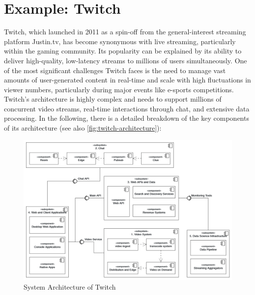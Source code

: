 \section{Example: Twitch}
Twitch, which launched in 2011 as a spin-off from the general-interest streaming platform Justin.tv, has become synonymous with live streaming, particularly within the gaming community. Its popularity can be explained by its ability to deliver high-quality, low-latency streams to millions of users simultaneously. 
One of the most significant challenges Twitch faces is the need to manage vast amounts of user-generated content in real-time and scale with high fluctuations in viewer numbers, particularly during major events like e-sports competitions.
Twitch's architecture is highly complex and needs to support millions of concurrent video streams, real-time interactions through chat, and extensive data processing. In the following, there is a detailed breakdown of the key components of its architecture (see also \autoref{fig:twitch-architecture}):

\begin{figure}[htpb]
    \centering
    \includegraphics[width=\linewidth]{images/TwitchArchitecture.png}
    \caption[System Architecture of Twitch]{System Architecture of Twitch}\label{fig:twitch-architecture}
\end{figure}

